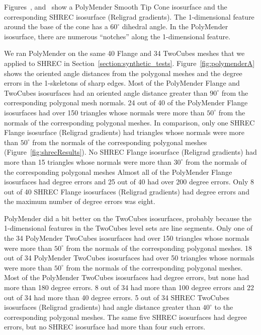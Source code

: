 Figures~, 
and~
show a PolyMender Smooth Tip Cone isosurface and 
the corresponding SHREC isosurface (Religrad gradients).
The 1-dimensional feature around the base of the cone has a $60^\circ$ dihedral angle.
In the PolyMender isosurface,
there are numerous ``notches'' along the 1-dimensional feature.

We ran PolyMender on the same 40 Flange and 34 TwoCubes meshes
that we applied to SHREC in Section~\ref{section:synthetic_tests}.
Figure~\ref{fig:polymenderA} shows the oriented angle distances from the polygonal meshes
and the degree errors in the 1-skeletons of sharp edges.
Most of the PolyMender Flange and TwoCubes isosurfaces had an oriented angle distance greater than $90^\circ$
from the corresponding polygonal mesh normals.
24 out of 40 of the PolyMender Flange isosurfaces had over 150 triangles
whose normals were more than $50^\circ$ from the normals of the corresponding polygonal meshes.
In comparison, only one SHREC Flange isosurface (Religrad gradients) had triangles
whose normals were more than $50^\circ$ from the normals of the corresponding polygonal meshes
(Figure~\ref{fig:shrecResults}).
No SHREC Flange isosurface (Religrad gradients) had more than 15 triangles
whose normals were more than $30^\circ$ from the normals of the corresponding polygonal meshes
Almost all of the PolyMender Flange isosurfaces had degree errors
and 25 out of 40 had over 200 degree errors.
Only 8 out of 40 SHREC Flange isosurfaces (Religrad gradients) had degree errors
and the maximum number of degree errors was eight.

PolyMender did a bit better on the TwoCubes isosurfaces,
probably because the 1-dimensional features in the TwoCubes level sets are line segments.
Only one of the 34 PolyMender TwoCubes isosurfaces had over 150 triangles
whose normals were more than $50^\circ$ from the normals of the corresponding polygonal meshes.
18 out of 34 PolyMender TwoCubes isosurfaces had over 50 triangles
whose normals were more than $50^\circ$ from the normals of the corresponding polygonal meshes.
Most of the PolyMender TwoCubes isosurfaces had degree errors,
but none had more than 180 degree errors.
8 out of 34 had more than 100 degree errors
and 22 out of 34 had more than 40 degree errors.
5 out of 34 SHREC TwoCubes isosurfaces (Religrad gradients)
had angle distance greater than $40^\circ$ to the corresponding polygonal meshes.
The same five SHREC isosurfaces had degree errors,
but no SHREC isosurface had more than four such errors.


